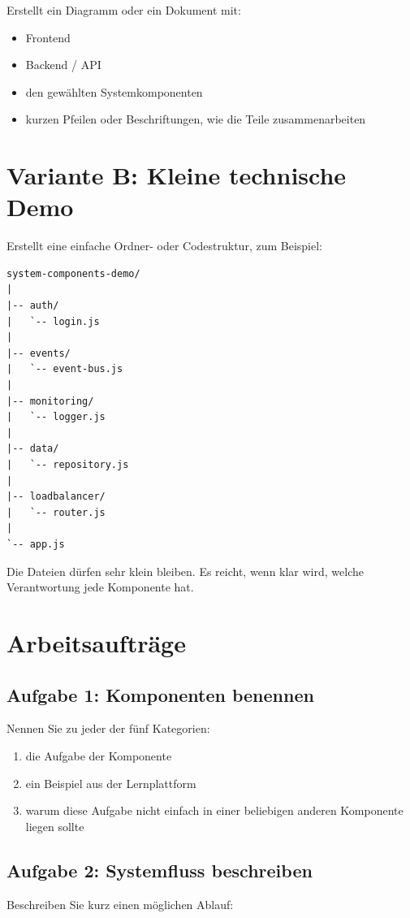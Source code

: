 \documentclass[a4paper,12pt]{article}
\begin{document}
Erstellt ein Diagramm oder ein Dokument mit:

\begin{itemize}
\item Frontend
\item Backend / API
\item den gewählten Systemkomponenten
\item kurzen Pfeilen oder Beschriftungen, wie die Teile zusammenarbeiten
\end{itemize}

\section*{Variante B: Kleine technische Demo}

Erstellt eine einfache Ordner- oder Codestruktur, zum Beispiel:

\begin{lstlisting}
system-components-demo/
|
|-- auth/
|   `-- login.js
|
|-- events/
|   `-- event-bus.js
|
|-- monitoring/
|   `-- logger.js
|
|-- data/
|   `-- repository.js
|
|-- loadbalancer/
|   `-- router.js
|
`-- app.js
\end{lstlisting}

Die Dateien dürfen sehr klein bleiben. Es reicht, wenn klar wird, welche
Verantwortung jede Komponente hat.

\section*{Arbeitsaufträge}

\subsection*{Aufgabe 1: Komponenten benennen}
Nennen Sie zu jeder der fünf Kategorien:
\begin{enumerate}
\item die Aufgabe der Komponente
\item ein Beispiel aus der Lernplattform
\item warum diese Aufgabe nicht einfach in einer beliebigen anderen Komponente liegen sollte
\end{enumerate}

\subsection*{Aufgabe 2: Systemfluss beschreiben}
Beschreiben Sie kurz einen möglichen Ablauf:
\end{document}
